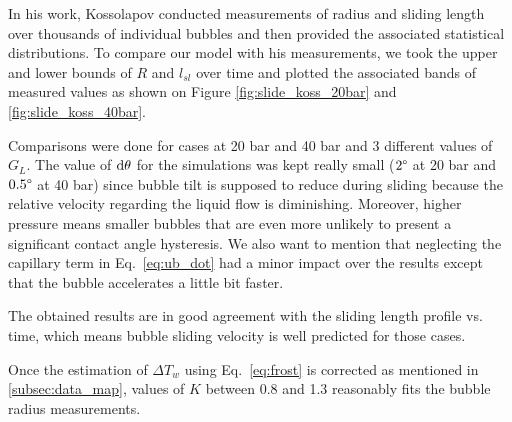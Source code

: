 In his work, Kossolapov \cite{kossolapov_experimental_2021} conducted measurements of radius and sliding length over thousands of individual bubbles and then provided the associated statistical distributions. To compare our model with his measurements, we took the upper and lower bounds of $R$ and $l_{sl}$ over time and plotted the associated bands of measured values as shown on Figure \ref{fig:slide_koss_20bar} and \ref{fig:slide_koss_40bar}.


Comparisons were done for cases at 20 bar and 40 bar and 3 different values of $G_{L}$. The value of $\mathrm{d}\theta$ for the simulations was kept really small ($2 \degree$ at 20 bar and $0.5\degree$ at 40 bar) since bubble tilt is supposed to reduce during sliding because the relative velocity regarding the liquid flow is diminishing. Moreover, higher pressure means smaller bubbles that are even more unlikely to present a significant contact angle hysteresis. We also want to mention that neglecting the capillary term in Eq.~\ref{eq:ub_dot} had a minor impact over the results except that the bubble accelerates a little bit faster. 

The obtained results are in good agreement with the sliding length profile vs. time, which means bubble sliding velocity is well predicted for those cases.

Once the estimation of $\Delta T_{w}$ using Eq.~\ref{eq:frost} is corrected as mentioned in \ref{subsec:data_map}, values of $K$ between 0.8 and 1.3 reasonably fits the bubble radius measurements.






